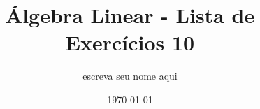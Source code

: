 \documentclass[leqno]{article}
\numberwithin{equation}{section}
\begin{document}
\newtheorem{teo}{Teorema}[section] \newtheorem*{teo*}{Teorema}
\newtheorem{prop}[teo]{Proposição} \newtheorem*{prop*}{Proposição}
\newtheorem{lema}[teo]{Lemma} \newtheorem*{lema*}{Lema}
\newtheorem{cor}[teo]{Corolário} \newtheorem*{cor*}{Corolário}

\theoremstyle{definition}
\newtheorem{defi}[teo]{Definição} \newtheorem*{defi*}{Definição}
\newtheorem{exem}[teo]{Exemplo} \newtheorem*{exem*}{Exemplo}
\newtheorem{obs}[teo]{Observação} \newtheorem*{obs*}{Observação}
\newtheorem*{hipo}{Hipóteses}
\newtheorem*{nota}{Notação}

\newcommand{\ds}{\displaystyle} \newcommand{\nl}{\newline}
\newcommand{\eps}{\varepsilon} \newcommand{\ssty}{\scriptstyle}
\newcommand{\bE}{\mathbb{E}}
\newcommand{\cB}{\mathcal{B}}
\newcommand{\cF}{\mathcal{F}}
\newcommand{\cA}{\mathcal{A}}
\newcommand{\cM}{\mathcal{M}}
\newcommand{\cD}{\mathcal{D}}
\newcommand{\cN}{\mathcal{N}}
\newcommand{\cL}{\mathcal{L}}
\newcommand{\cLN}{\mathcal{LN}}
\newcommand{\bP}{\mathbb{P}}
\newcommand{\bQ}{\mathbb{Q}}
\newcommand{\bN}{\mathbb{N}}
\newcommand{\bR}{\mathbb{R}}
\newcommand{\bZ}{\mathbb{Z}}

\newcommand{\bfw}{\mathbf{w}}
\newcommand{\bfv}{\mathbf{v}}
\newcommand{\bfu}{\mathbf{u}}
\newcommand{\bfx}{\mathbf{x}}
\newcommand{\bfb}{\mathbf{b}}

\newcommand{\bvecc}[2]{%
  \begin{bmatrix} #1 \\ #2  \end{bmatrix}
}
\newcommand{\bveccc}[3]{%
  \begin{bmatrix} #1 \\ #2 \\ #3  \end{bmatrix}
}

\newenvironment{sol}
{
    \vspace{4mm}
    \noindent\textbf{Resolução:}
    \strut\newline
    \smallskip
    \hspace{-3.5mm}
}
{\noindent\rule{4cm}{.1mm}}


\title{Álgebra Linear - Lista de Exercícios 10}

\author{escreva seu nome aqui}

\date{\today}
\end{document}
